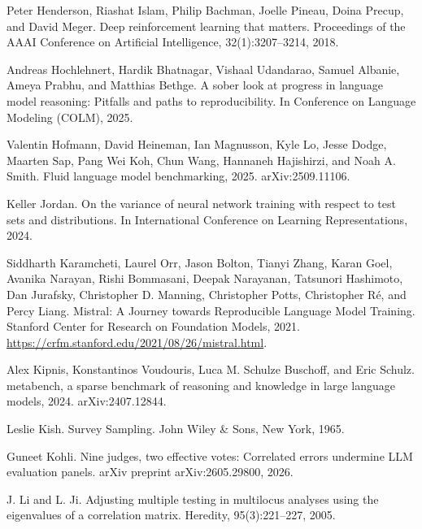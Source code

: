 \noindent Peter Henderson, Riashat Islam, Philip Bachman, Joelle Pineau, Doina Precup, and David Meger. Deep reinforcement learning that matters. Proceedings of the AAAI Conference on Artificial Intelligence, 32(1):3207--3214, 2018.\par\medskip

\noindent Andreas Hochlehnert, Hardik Bhatnagar, Vishaal Udandarao, Samuel Albanie, Ameya Prabhu, and Matthias Bethge. A sober look at progress in language model reasoning: Pitfalls and paths to reproducibility. In Conference on Language Modeling (COLM), 2025.\par\medskip

\noindent Valentin Hofmann, David Heineman, Ian Magnusson, Kyle Lo, Jesse Dodge, Maarten Sap, Pang Wei Koh, Chun Wang, Hannaneh Hajishirzi, and Noah A. Smith. Fluid language model benchmarking, 2025. arXiv:2509.11106.\par\medskip

\noindent Keller Jordan. On the variance of neural network training with respect to test sets and distributions. In International Conference on Learning Representations, 2024.\par\medskip

\noindent Siddharth Karamcheti, Laurel Orr, Jason Bolton, Tianyi Zhang, Karan Goel, Avanika Narayan, Rishi Bommasani, Deepak Narayanan, Tatsunori Hashimoto, Dan Jurafsky, Christopher D. Manning, Christopher Potts, Christopher R\'{e}, and Percy Liang. Mistral: A Journey towards Reproducible Language Model Training. Stanford Center for Research on Foundation Models, 2021. \url{https://crfm.stanford.edu/2021/08/26/mistral.html}.\par\medskip

\noindent Alex Kipnis, Konstantinos Voudouris, Luca M. Schulze Buschoff, and Eric Schulz. metabench, a sparse benchmark of reasoning and knowledge in large language models, 2024. arXiv:2407.12844.\par\medskip

\noindent Leslie Kish. Survey Sampling. John Wiley \& Sons, New York, 1965.\par\medskip

\noindent Guneet Kohli. Nine judges, two effective votes: Correlated errors undermine LLM evaluation panels. arXiv preprint arXiv:2605.29800, 2026.\par\medskip

\noindent J. Li and L. Ji. Adjusting multiple testing in multilocus analyses using the eigenvalues of a correlation matrix. Heredity, 95(3):221--227, 2005.\par\medskip

